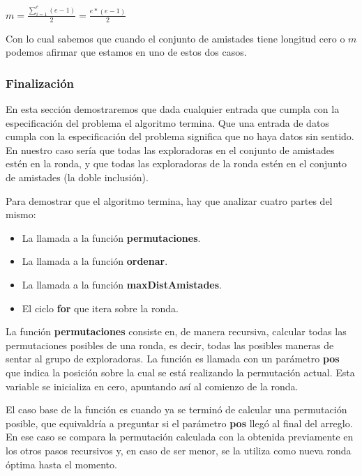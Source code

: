 \documentclass[spanish,a4paper]{article}
\begin{document}
\begin{center}
$m = \frac{\sum\limits_{i=1}^e (e-1)}{2} = \frac{e*(e-1)}{2}$
\end{center}

\vspace{3mm}

Con lo cual sabemos que cuando el conjunto de amistades tiene longitud cero o $m$ podemos afirmar que estamos 
en uno de estos dos casos.





\subsubsection{Finalización}

En esta sección demostraremos que dada cualquier entrada que cumpla con la especificación del problema el 
algoritmo termina. Que una entrada de datos cumpla con la especificación del problema significa que no haya
datos sin sentido. En nuestro caso sería que todas las exploradoras en el conjunto de amistades estén en la  
ronda, y que todas las exploradoras de la ronda estén en el conjunto de amistades (la doble inclusión).

Para demostrar que el algoritmo termina, hay que analizar cuatro partes del mismo:
\begin{itemize}
  \item La llamada a la función \textbf{permutaciones}.
  \item La llamada a la función \textbf{ordenar}.
  \item La llamada a la función \textbf{maxDistAmistades}.
  \item El ciclo \textbf{for} que itera sobre la ronda.
\end{itemize}

La función \textbf{permutaciones} consiste en, de manera recursiva, calcular todas las permutaciones posibles 
de una ronda, es decir, todas las posibles maneras de sentar al grupo de exploradoras.
La función es llamada con un parámetro \textbf{pos} que indica la posición sobre la cual se está realizando 
la permutación actual. Esta variable se inicializa en cero, apuntando así al comienzo de la ronda.

El caso base de la función es cuando ya se terminó de calcular una permutación posible, que equivaldría a 
preguntar si el parámetro \textbf{pos} llegó al final del arreglo. En ese caso se compara la 
permutación calculada con la obtenida previamente en los otros pasos recursivos y, en caso de ser menor, se 
la utiliza como nueva ronda óptima hasta el momento.
\end{document}
